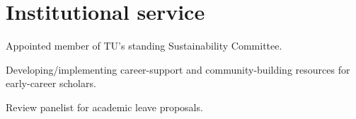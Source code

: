 \section{Institutional service}

Appointed member of TU's standing Sustainability Committee.

Developing/implementing career-support and community-building resources for early-career scholars.

Review panelist for academic leave proposals.